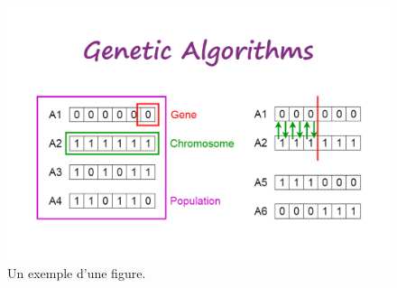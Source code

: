 \begin{figure}[h]
\centering
\includegraphics[scale=0.3]{Images/Chapter4/GeneticAlgorithm.png}
\caption{Un exemple d'une figure.}
\label{fig:01}
\end{figure}

~~\\
~~\\



